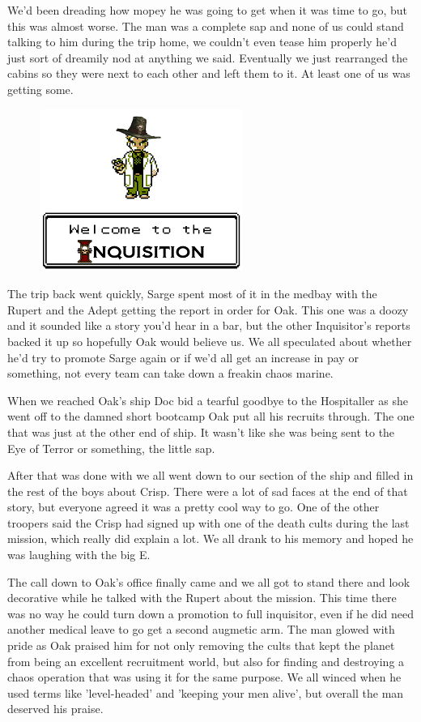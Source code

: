 We'd been dreading how mopey he was going to get when it was time to go, but this was almost worse. 
The man was a complete sap and none of us could stand talking to him during the trip home, we couldn't even tease him properly he'd just sort of dreamily nod at anything we said. 
Eventually we just rearranged the cabins so they were next to each other and left them to it. 
At least one of us was getting some.

\begin{figure}
	\begin{center}
		\includegraphics[width=\figwidth]{pics/6/54.png}
	\end{center}
\end{figure}
The trip back went quickly, Sarge spent most of it in the medbay with the Rupert and the Adept getting the report in order for Oak. 
This one was a doozy and it sounded like a story you'd hear in a bar, but the other Inquisitor's reports backed it up so hopefully Oak would believe us. 
We all speculated about whether he'd try to promote Sarge again or if we'd all get an increase in pay or something, not every team can take down a freakin chaos marine.

When we reached Oak's ship Doc bid a tearful goodbye to the Hospitaller as she went off to the damned short bootcamp Oak put all his recruits through. 
The one that was just at the other end of ship. 
It wasn't like she was being sent to the Eye of Terror or something, the little sap. 

After that was done with we all went down to our section of the ship and filled in the rest of the boys about Crisp. 
There were a lot of sad faces at the end of that story, but everyone agreed it was a pretty cool way to go. 
One of the other troopers said the Crisp had signed up with one of the death cults during the last mission, which really did explain a lot. 
We all drank to his memory and hoped he was laughing with the big E.

The call down to Oak's office finally came and we all got to stand there and look decorative while he talked with the Rupert about the mission. 
This time there was no way he could turn down a promotion to full inquisitor, even if he did need another medical leave to go get a second augmetic arm. 
The man glowed with pride as Oak praised him for not only removing the cults that kept the planet from being an excellent recruitment world, but also for finding and destroying a chaos operation that was using it for the same purpose. 
We all winced when he used terms like 'level-headed' and 'keeping your men alive', but overall the man deserved his praise.


